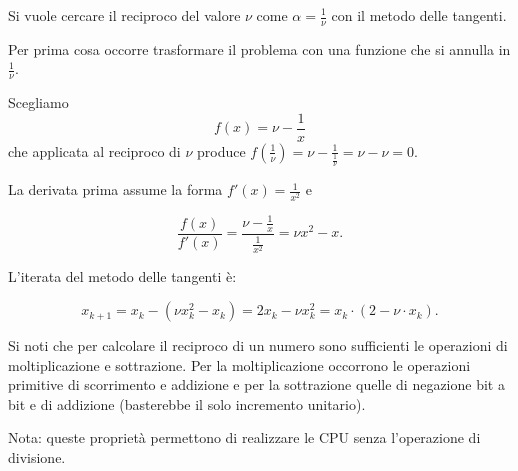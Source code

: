 Si vuole cercare il reciproco del valore $\nu$ come $\alpha = \frac{1}{\nu}$ con il metodo delle tangenti.

Per prima cosa occorre trasformare il problema con una funzione che si annulla in $\frac{1}{\nu}$.

Scegliamo $$f(x) = \nu - \frac{1}{x}$$ che applicata al reciproco di $\nu$ produce
$f(\frac{1}{\nu}) = \nu - \frac{1}{\frac{1}{\nu}} = \nu - \nu = 0$. 

La derivata prima assume la forma $f'(x) = \frac{1}{x^2}$ e

$$\frac{f(x)}{f'(x)} = \frac{\nu - \frac{1}{x}}{\frac{1}{x^2}} = \nu x^2 - x.$$

L'iterata del metodo delle tangenti è:

$$x_{k+1} = x_k - (\nu x_k^2 - x_k) = 2 x_k - \nu x_k^2  = x_k \cdot (2 - \nu \cdot x_k).$$

Si noti che per calcolare il reciproco di un numero sono sufficienti le operazioni di moltiplicazione e sottrazione.
Per la moltiplicazione occorrono le operazioni primitive di scorrimento e addizione e per la sottrazione quelle di negazione bit a bit e di addizione (basterebbe il solo incremento unitario).

Nota: queste proprietà permettono di realizzare le CPU senza l'operazione di divisione.


